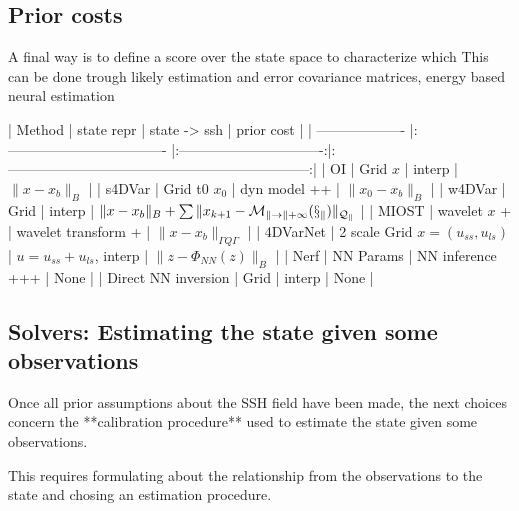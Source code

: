 \begin{bibunit}
  \subsection{Prior costs}
A final way is to define a score over the state space to characterize which 
This can be done trough likely estimation and error covariance matrices, energy based neural estimation




| Method              | state repr                         |          state -> ssh           |                            prior cost                             |
| ------------------- |:---------------------------------- |:-------------------------------:|:-----------------------------------------------------------------:|
| OI                  | Grid $x$                           |             interp              |                          $\|x - x_b\|_B$                          |
| s4DVar              | Grid t0 $x_0$                      |          dyn model  ++          |                         $\|x_0 - x_b\|_B$                         |
| w4DVar              | Grid                               |             interp              | $\|x - x_b\|_B + \sum\|x_{k+1} - \cal{M}_{k\to k+1}(x_k)\|_{Q_k}$ |
| MIOST               | wavelet $x$    +                   |      wavelet transform   +      |                  $\|x - x_b\|_{\Gamma Q\Gamma}$                   |
| 4DVarNet            | 2 scale Grid $x =(u_{ss}, u_{ls})$ | $u = u_{ss} + u_{ls}$,   interp |                     $\|z - \Phi_{NN}(z)\|_B$                      |
| Nerf                | NN Params                          |        NN inference +++         |                               None                                |
| Direct NN inversion | Grid                               |             interp              |                               None                                |



  \subsection{Solvers: Estimating the state given some observations}

Once all prior assumptions about the SSH field have been made, the next choices concern the **calibration procedure** used to estimate the state given some observations.

This requires formulating about the relationship from the observations to the state and chosing an estimation procedure.



\end{bibunit}
